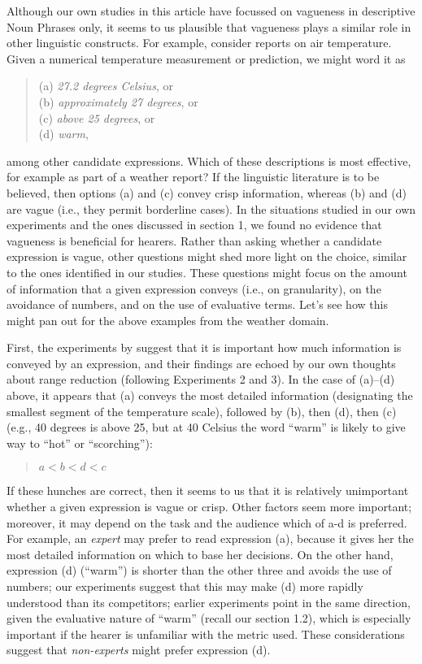 Although our own studies in this article have focussed on vagueness in descriptive Noun Phrases only, it seems to us plausible that vagueness plays a similar role in other
linguistic constructs. For example, consider reports on air temperature. Given a numerical
temperature measurement or prediction, we might word it as 
%
\begin{quote}
(a) {\em 27.2 degrees Celsius}, or\\
(b) {\em approximately 27 degrees}, or\\
(c) {\em above 25 degrees}, or\\
(d) {\em warm}, 
\end{quote}
%
among other candidate expressions. Which of these descriptions is most effective, for example as part of a weather report? If the linguistic literature is to be believed, then options (a) and (c) convey crisp information, whereas (b) and (d) are vague (i.e., they permit borderline cases). In the situations studied in our own experiments and the ones discussed in section 1, we found no evidence that vagueness is beneficial for hearers. Rather than asking whether a candidate expression is vague, other questions might shed more light on the choice, similar to the ones identified in our studies. These questions might focus on the amount of information that a given expression conveys (i.e., on granularity), on the avoidance of numbers, and on the use of evaluative terms. Let's see how this might pan out for the above examples from the weather domain.

First, the experiments by \citeauthor{Mishra01042011} suggest that it is important how much information is conveyed by an expression, and their findings are echoed by our own thoughts about range reduction (following Experiments 2 and 3). In the case of (a)--(d) above, it appears that (a) conveys the most detailed information (designating the smallest segment of the temperature scale), followed by (b), then (d), then (c) (e.g., 40 degrees is above 25, but at 40 Celsius the word ``warm'' is likely to give way to ``hot'' or ``scorching''): 
%
\begin{quote}
$a < b < d < c$
\end{quote}
%
If these hunches are correct, then it seems to us that it is relatively unimportant whether a given expression is vague or crisp. Other factors seem more important; moreover, it may depend on the task and the audience which of a-d is preferred. For example, an \emph{expert} may prefer to read expression (a), because it gives her the most detailed information on which to base her decisions. On the other hand, expression (d) (``warm'') is shorter than the other three and avoids the use of numbers; our experiments suggest that this may make (d) more rapidly understood than its competitors; earlier experiments point in the same direction, given the evaluative nature of ``warm'' (recall our section 1.2), which is especially important if the hearer is unfamiliar with the metric used. These considerations suggest that {\em non-experts} might prefer expression (d). 

